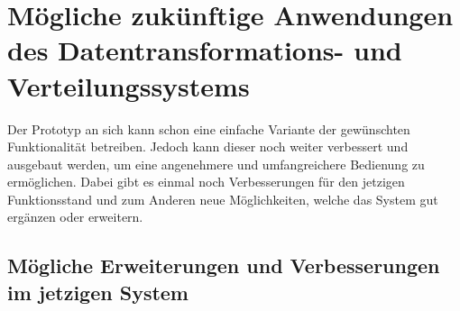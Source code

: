 \chapter{Mögliche zukünftige Anwendungen des Datentransformations- und Verteilungssystems}

Der Prototyp an sich kann schon eine einfache Variante der gewünschten Funktionalität betreiben. Jedoch kann dieser noch weiter verbessert und ausgebaut werden, um eine angenehmere und umfangreichere Bedienung zu ermöglichen. Dabei gibt es einmal noch Verbesserungen für den jetzigen Funktionsstand und zum Anderen neue Möglichkeiten, welche das System gut ergänzen oder erweitern. 

\section{Mögliche Erweiterungen und Verbesserungen im jetzigen System}

